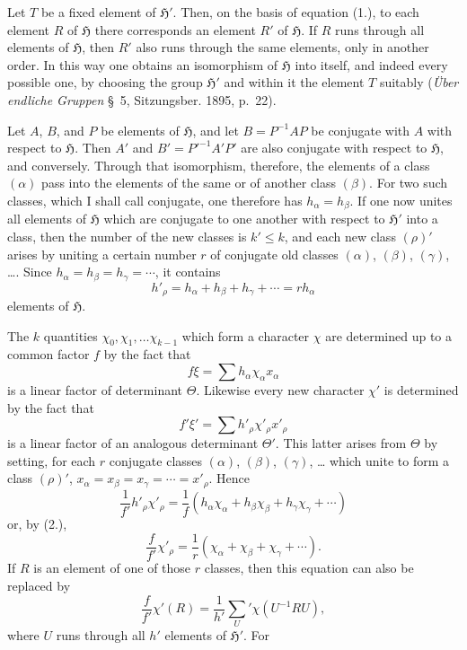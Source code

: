 \documentclass[11pt]{article}
\newcommand{\grp}{\mathfrak{H}}
\begin{document}
Let $T$ be a fixed element of $\grp'$. Then, on the basis of equation (1.), to each element $R$ of $\grp$ there corresponds an element $R'$ of $\grp$. If $R$ runs through all elements of $\grp$, then $R'$ also runs through the same elements, only in another order. In this way one obtains an isomorphism of $\grp$ into itself, and indeed every possible one, by choosing the group $\grp'$ and within it the element $T$ suitably (\emph{Über endliche Gruppen} \S~5, Sitzungsber. 1895, p.~22).

Let $A$, $B$, and $P$ be elements of $\grp$, and let $B=P^{-1}AP$ be conjugate with $A$ with respect to $\grp$. Then $A'$ and $B'=P'^{-1}A'P'$ are also conjugate with respect to $\grp$, and conversely. Through that isomorphism, therefore, the elements of a class $(\alpha)$ pass into the elements of the same or of another class $(\beta)$. For two such classes, which I shall call conjugate, one therefore has $h_\alpha=h_\beta$. If one now unites all elements of $\grp$ which are conjugate to one another with respect to $\grp'$ into a class, then the number of the new classes is $k'\le k$, and each new class $(\rho)'$ arises by uniting a certain number $r$ of conjugate old classes $(\alpha)$, $(\beta)$, $(\gamma)$, \ldots. Since $h_\alpha=h_\beta=h_\gamma=\cdots$, it contains
\begin{equation*}\tag{2.}
h'_\rho=h_\alpha+h_\beta+h_\gamma+\cdots=rh_\alpha
\end{equation*}
elements of $\grp$.

The $k$ quantities $\chi_0,\chi_1,\ldots \chi_{k-1}$ which form a character $\chi$ are determined up to a common factor $f$ by the fact that
\begin{equation*}\tag{3.}
f\xi=\sum h_\alpha\chi_\alpha x_\alpha
\end{equation*}
is a linear factor of determinant $\Theta$. Likewise every new character $\chi'$ is determined by the fact that
\[
f'\xi'=\sum h'_\rho\chi'_\rho x'_\rho
\]
is a linear factor of an analogous determinant $\Theta'$. This latter arises from $\Theta$ by setting, for each $r$ conjugate classes $(\alpha)$, $(\beta)$, $(\gamma)$, \ldots{} which unite to form a class $(\rho)'$, $x_\alpha=x_\beta=x_\gamma=\cdots=x'_\rho$. Hence
\[
\frac{1}{f'}h'_\rho\chi'_\rho=\frac{1}{f}(h_\alpha\chi_\alpha+h_\beta\chi_\beta+h_\gamma\chi_\gamma+\cdots)
\]
or, by (2.),
\begin{equation*}\tag{4.}
\frac{f}{f'}\chi'_\rho=\frac{1}{r}(\chi_\alpha+\chi_\beta+\chi_\gamma+\cdots).
\end{equation*}
If $R$ is an element of one of those $r$ classes, then this equation can also be replaced by
\begin{equation*}\tag{5.}
\frac{f}{f'}\chi'(R)=\frac{1}{h'}\sum_U'\chi(U^{-1}RU),
\end{equation*}
where $U$ runs through all $h'$ elements of $\grp'$. For
\end{document}
